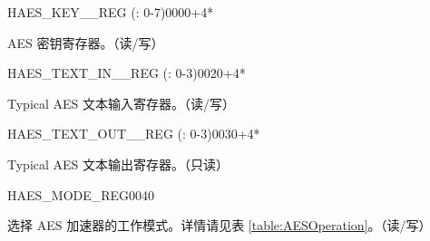 \begin{register}{H}{AES\_KEY\_\_REG (: 0-7)}{\hexprefix{}0000+4*}\label{regdesc:AESKEYnREG}
%
\regnewline%
\begin{regdesc}\begin{reglist}
\item [AES\_KEY\_\regindex{n}\_REG (\regindex{n}: 0-7)]AES 密钥寄存器。（读/写）
\end{reglist}\end{regdesc}
\end{register}

\begin{register}{H}{AES\_TEXT\_IN\_\_REG (: 0-3)}{\hexprefix{}0020+4*}\label{regdesc:AESTEXTINnREG}
%
\regnewline%
\begin{regdesc}\begin{reglist}
\item [AES\_TEXT\_IN\_\regindex{m}\_REG (\regindex{m}: 0-3)] Typical AES 文本输入寄存器。（读/写）
\end{reglist}\end{regdesc}
\end{register}


\begin{register}{H}{AES\_TEXT\_OUT\_\_REG (: 0-3)}{\hexprefix{}0030+4*}\label{regdesc:AESTEXTOUTnREG}
%
\regnewline%
\begin{regdesc}\begin{reglist}
\item [AES\_TEXT\_OUT\_\regindex{m}\_REG (\regindex{m}: 0-3)] Typical AES 文本输出寄存器。（只读）
\end{reglist}\end{regdesc}
\end{register}


\begin{register}{H}{AES\_MODE\_REG}{\hexprefix{}0040}\label{regdesc:AESMODEREG}
%
%
\regnewline%
\begin{regdesc}\begin{reglist}
\item [AES\_MODE] 选择 AES 加速器的工作模式。详情请见表 \ref{table:AESOperation}。（读/写）
\end{reglist}\end{regdesc}
\end{register}


